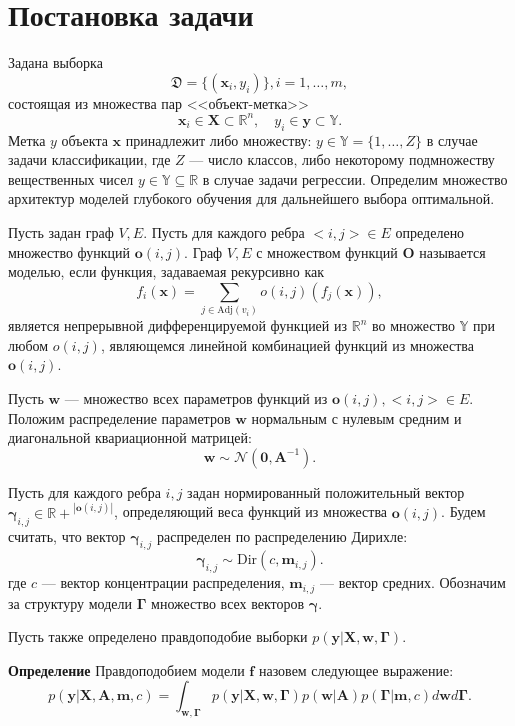 \documentclass[12pt]{article}
\begin{document}
\section{Постановка задачи}
Задана выборка  \begin{equation}\label{eq:dataset}\mathfrak{D} = \{(\mathbf{x}_i,y_i)\}, i = 1,\dots,m,\end{equation} состоящая из множества пар <<объект-метка>> $$\mathbf{x}_i \in \mathbf{X} \subset \mathbb{R}^n, \quad {y}_i \in \mathbf{y} \subset \mathbb{Y}.$$ Метка ${y}$  объекта $\mathbf{x}$ принадлежит либо множеству: ${y} \in \mathbb{Y} = \{1, \dots, Z\}$ в случае задачи классификации, где $Z$ --- число классов, либо некоторому подмножеству вещественных чисел ${y} \in \mathbb{Y}  \subseteq \mathbb{R}$ в случае задачи регрессии. Определим множество архитектур моделей глубокого обучения для дальнейшего выбора оптимальной. 

Пусть задан граф $V,E$. Пусть для каждого ребра $<i,j> \in E$ определено множество функций $\mathbf{o}(i,j)$. Граф $V, E$ с множеством функций $\mathbf{O}$ называется моделью, если функция, задаваемая рекурсивно как 
\[
    f_i(\mathbf{x}) = \sum_{j \in \text{Adj}(v_i)} o(i,j) (f_{j}(\mathbf{x})), 
\]
является непрерывной дифференцируемой функцией из $\mathbb{R}^n$ во множество $\mathbb{Y}$ при любом $o(i,j)$, являющемся линейной комбинацией функций из множества $\mathbf{o}(i,j)$.

Пусть $\mathbf{w}$ --- множество всех параметров функций из $\mathbf{o}(i,j), <i,j> \in E$.
Положим распределение параметров $\mathbf{w}$ нормальным с нулевым средним и диагональной квариационной матрицей:
\[
    \mathbf{w} \sim \mathcal{N}(\mathbf{0}, \mathbf{A}^{-1}).
\]

Пусть для каждого ребра $i,j$ задан нормированный положительный вектор $\boldsymbol{\gamma}_{i,j} \in \mathbb{R+}^{|\mathbf{o}(i,j)|}$, определяющий веса функций из множества $\mathbf{o}(i,j)$.
Будем считать, что вектор $\boldsymbol{\gamma}_{i,j}$ распределен по распределению Дирихле:
\[
    \boldsymbol{\gamma}_{i,j}  \sim \text{Dir}({c}, \mathbf{m}_{i,j}).
\] 
где $c$ --- вектор концентрации распределения, $\mathbf{m}_{i,j}$ --- вектор средних. Обозначим за структуру модели $\boldsymbol{\Gamma}$ множество всех векторов $\boldsymbol{\gamma}$.

Пусть также определено правдоподобие выборки $p(\mathbf{y}|\mathbf{X}, \mathbf{w}, \boldsymbol{\Gamma}).$

\textbf{Определение} Правдоподобием модели $\mathbf{f}$ назовем следующее выражение: 
\begin{equation}
\label{eq:evidence}
	p(\mathbf{y}|\mathbf{X},\mathbf{A},\mathbf{m}, c) = \int_{\mathbf{w}, \boldsymbol{\Gamma} } p(\mathbf{y}|\mathbf{X},\mathbf{w},  \boldsymbol{\Gamma})p(\mathbf{w}|\mathbf{A})p(\boldsymbol{\Gamma}|\mathbf{m}, c)d\mathbf{w}d\mathbf{\Gamma}.
\end{equation}
\end{document}
